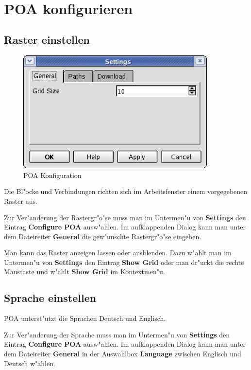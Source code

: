 \documentclass[a4paper,titlepage,12pt,ngerman]{scrbook}
\begin{document}
\newpage
\section{POA konfigurieren}

\subsection{Raster einstellen}
\begin{figure}[htbp]

\begin{center}

\includegraphics[width=10cm]{POAConfiguration1}

\caption{POA Konfiguration}\label{test}

\end{center}

\end{figure}
Die Bl"ocke und Verbindungen richten sich im Arbeitsfenster einem vorgegebenen Raster aus.\par

Zur Ver"anderung der Rastergr"o"se muss man im Untermen"u von {\bf Settings} den Eintrag {\bf Configure POA} ausw"ahlen. Im aufklappenden Dialog kann man unter dem Dateireiter {\bf General} die gew"unschte Rastergr"o"se eingeben.\par
Man kann das Raster anzeigen lassen oder ausblenden. Dazu w"ahlt man im Untermen"u von {\bf Settings} den Eintrag {\bf Show Grid} oder man dr"uckt die rechte Maustaste und w"ahlt {\bf Show Grid} im Kontextmen"u.


\subsection{Sprache einstellen}
POA unterst"utzt die Sprachen Deutsch und Englisch.\par
Zur Ver"anderung der Sprache muss man im Untermen"u von {\bf Settings} den Eintrag {\bf Configure POA} ausw"ahlen. Im aufklappenden Dialog kann man unter dem Dateireiter {\bf General} in der Auswahlbox {\bf Language} zwischen Englisch und Deutsch w"ahlen.\par
\end{document}

